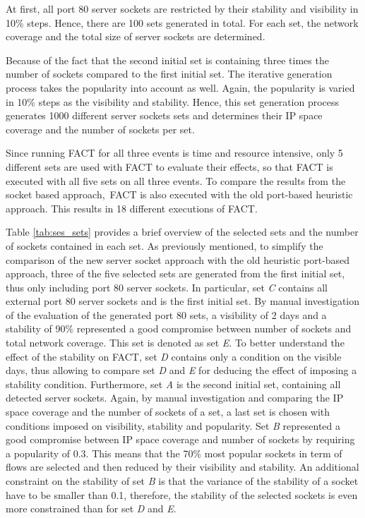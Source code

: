 At first, all port 80 \glspl{server socket} are restricted by their stability and visibility in 10\% steps. Hence, there are 100 sets generated in total. 
For each set, the network coverage and the total size of \glspl{server socket} are determined. 

Because of the fact that the second initial set is containing three times the number of sockets compared to the first initial set.
The iterative generation process takes the popularity into account as well.
Again, the popularity is varied in 10\% steps as the visibility and stability. 
Hence, this set generation process generates 1000 different \glspl{server socket} sets and determines their IP space coverage and the number of sockets per set.

Since running \gls{FACT} for all three events is time and resource intensive, only 5 different sets are used with \gls{FACT} to evaluate their effects, so that \gls{FACT} is executed with all five sets on all three events. To compare the results from the socket based approach, \gls{FACT} is also executed with the old port-based heuristic approach. This results in 18 different executions of \gls{FACT}.

Table \ref{tab:ses_sets} provides a brief overview of the selected sets and the number of sockets contained in each set. 
As previously mentioned, to simplify the comparison of the new \gls{server socket} approach with the old heuristic port-based approach, three of the five selected sets are generated from the first initial set, thus only including port 80 \glspl{server socket}. In particular, set \emph{C} contains all external port 80 \glspl{server socket} and is the first initial set. 
By manual investigation of the evaluation of the generated port 80 sets, a visibility of 2 days and a stability of 90\% represented a good compromise between number of sockets and total network coverage. 
This set is denoted as set \emph{E}. To better understand the effect of the stability on \gls{FACT}, set \emph{D} contains only a condition on the visible days, thus allowing to compare set \emph{D} and \emph{E} for deducing the effect of imposing a stability condition. 
Furthermore, set \emph{A} is the second initial set, containing all detected \glspl{server socket}. 
Again, by manual investigation and comparing the IP space coverage and the number of sockets of a set, a last set is chosen with conditions imposed on visibility, stability and popularity. 
Set \emph{B} represented a good compromise between IP space coverage and number of sockets by requiring a popularity of 0.3. This means that the 70\% most popular sockets in term of flows are selected and then reduced by their visibility and stability. An additional constraint on the stability of set \emph{B} is that the variance of the stability of a socket have to be smaller than 0.1, therefore, the stability of the selected sockets is even more constrained than for set \emph{D} and \emph{E}.

